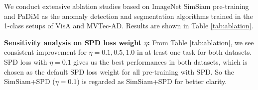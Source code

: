 \documentclass[runningheads]{llncs}
\begin{document}
\begin{table*}[!t]
	\centering
    \caption{1-class performance evaluation on VisA and MVTec-AD with PatchCore.}
    \label{tab:1cls_patchcore}
	\setlength{\tabcolsep}{7pt}
\end{table*}

We conduct extensive ablation studies based on ImageNet SimSiam pre-training and PaDiM as the anomaly detection and segmentation algorithms trained in the 1-class setups of VisA and MVTec-AD. Results are shown in Table \ref{tab:ablation}.

\noindent\textbf{Sensitivity analysis on SPD loss weight $\eta$:} From Table \ref{tab:ablation}, we see consistent improvement for $\eta=0.1,0.5,1.0$ in at least one task for both datasets. SPD loss with $\eta=0.1$ gives us the best performances in both datasets, which is chosen as the default SPD loss weight for all pre-training with SPD. So the SimSiam+SPD ($\eta=0.1$) is regarded as SimSiam+SPD for better clarity.
\end{document}
